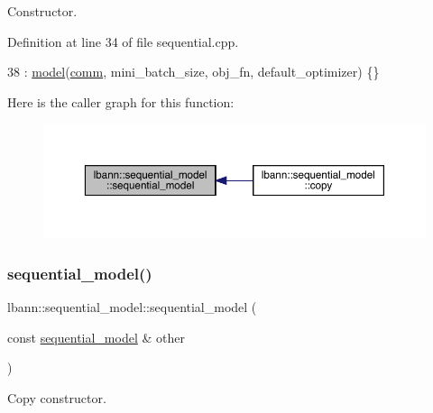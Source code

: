 Constructor. 

Definition at line 34 of file sequential.\+cpp.


\begin{DoxyCode}
38   : \hyperlink{classlbann_1_1model_a6feaee921c434bbfc32451ed874cc051}{model}(\hyperlink{file__io_8cpp_ab048c6f9fcbcfaa57ce68b00263dbebe}{comm}, mini\_batch\_size, obj\_fn, default\_optimizer) \{\}
\end{DoxyCode}
Here is the caller graph for this function\+:\nopagebreak
\begin{figure}[H]
\begin{center}
\leavevmode
\includegraphics[width=350pt]{classlbann_1_1sequential__model_a269f246d881186f8e8608dc4758cc6a6_icgraph}
\end{center}
\end{figure}
\mbox{\label{classlbann_1_1sequential__model_a03d6ed139f28f82411b5db7787c97ad2}} 
\subsubsection{\texorpdfstring{sequential\+\_\+model()}{sequential\_model()}\hspace{0.1cm}{\footnotesize\ttfamily [2/2]}}
{\footnotesize\ttfamily lbann\+::sequential\+\_\+model\+::sequential\+\_\+model (\begin{DoxyParamCaption}\item[{const \hyperlink{classlbann_1_1sequential__model}{sequential\+\_\+model} \&}]{other }\end{DoxyParamCaption})\hspace{0.3cm}{\ttfamily [default]}}

Copy constructor. \mbox{\label{classlbann_1_1sequential__model_ab56d457c38e89f6ea1c030168a018938}} 
